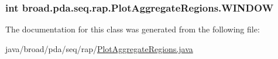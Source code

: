 \hypertarget{classbroad_1_1pda_1_1seq_1_1rap_1_1_plot_aggregate_regions_aacd401af92a77873fbdd1b0f6f413618}{
\subsubsection[{W\+I\+N\+D\+O\+W}]{\setlength{\rightskip}{0pt plus 5cm}int broad.\+pda.\+seq.\+rap.\+Plot\+Aggregate\+Regions.\+W\+I\+N\+D\+O\+W}}\label{classbroad_1_1pda_1_1seq_1_1rap_1_1_plot_aggregate_regions_aacd401af92a77873fbdd1b0f6f413618}


The documentation for this class was generated from the following file\+:\begin{DoxyCompactItemize}
\item 
java/broad/pda/seq/rap/\hyperlink{_plot_aggregate_regions_8java}{Plot\+Aggregate\+Regions.\+java}\end{DoxyCompactItemize}
